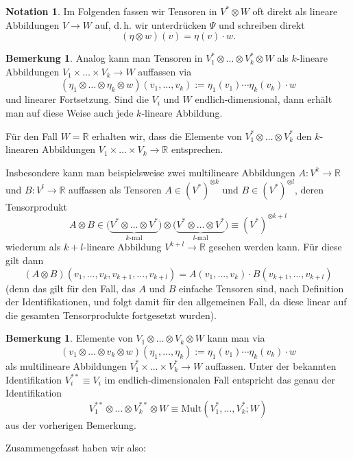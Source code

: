 \documentclass[a4paper]{scrreprt}
\numberwithin{equation}{chapter}
\newcommand{\R}{\mathbb{R}}
\theoremstyle{definition}
\newtheorem{bem}[defn]{Bemerkung}
\newtheorem{nota}[defn]{Notation}
\begin{document}
\begin{nota}
	Im Folgenden fassen wir Tensoren in $V^* \otimes W$ oft direkt als lineare Abbildungen $V\to W$ auf, d.\,h. wir unterdrücken $\Psi$ und schreiben direkt
\[(\eta\otimes w)(v) = \eta(v) \cdot w.\]
\end{nota}
\begin{bem}
	Analog kann man Tensoren in $V_1^* \otimes \dots \otimes V_k^* \otimes W$ als $k$-lineare Abbildungen $V_1 \times \dots \times V_k \to W$ auffassen via
	\[(\eta_1 \otimes \dots \otimes \eta_k \otimes w)(v_1, \dots, v_k) := \eta_1(v_1) \cdots \eta_k(v_k) \cdot w\]
	und linearer Fortsetzung. Sind die $V_i$ und $W$ endlich-dimensional, dann erhält man auf diese Weise auch jede $k$-lineare Abbildung.

	Für den Fall $W = \R$ erhalten wir, dass die Elemente von $V_1^* \otimes \dots \otimes V_k^*$ den $k$-linearen Abbildungen $V_1 \times \dots \times V_k \to \R$ entsprechen.

	Insbesondere kann man beispielsweise zwei multilineare Abbildungen $A\colon V^k \to \R$ und $B\colon V^l \to \R$ auffassen als Tensoren $A \in (V^*)^{\otimes k}$ und $B \in (V^*)^{\otimes l}$, deren Tensorprodukt
	\[A\otimes B \in \big(\underbrace{V^*\otimes \dots \otimes V^*}_\text{$k$-mal}\big) \otimes \big(\underbrace{V^*\otimes \dots \otimes V^*}_\text{$l$-mal}\big) \equiv (V^*)^{\otimes {k+l}}\]
	wiederum als $k+l$-lineare Abbildung $V^{k+l} \to \R$ gesehen werden kann. Für diese gilt dann
	\[(A\otimes B)(v_1,\dots,v_k, v_{k+1},\dots,v_{k+l}) = A(v_1,\dots,v_k) \cdot B(v_{k+1},\dots,v_{k+l})\]
	(denn das gilt für den Fall, das $A$ und $B$ einfache Tensoren sind, nach Definition der Identifikationen, und folgt damit für den allgemeinen Fall, da diese linear auf die gesamten Tensorprodukte fortgesetzt wurden).
\end{bem}
\begin{bem}
	Elemente von $V_1 \otimes \dots \otimes V_k \otimes W$ kann man via
	\[(v_1 \otimes \dots \otimes v_k \otimes w)(\eta_1, \dots, \eta_k) := \eta_1(v_1) \cdots \eta_k(v_k) \cdot w\]
	als multilineare Abbildungen $V_1^* \times \dots \times V_k^* \to W$ auffassen. Unter der bekannten Identifikation $V_i^{**} \equiv V_i$ im endlich-dimensionalen Fall entspricht das genau der Identifikation
	\[V_1^{**} \otimes \dots \otimes V_k^{**} \otimes W \equiv \mathrm{Mult}(V_1^*, \dots, V_k^*; W)\]
	aus der vorherigen Bemerkung.
\end{bem}
Zusammengefasst haben wir also:
\end{document}
